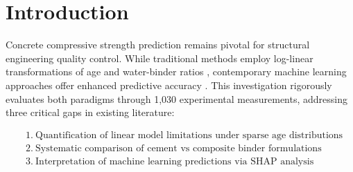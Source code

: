 \section{Introduction}

Concrete compressive strength prediction remains pivotal for structural engineering quality control. While traditional methods employ log-linear transformations of age and water-binder ratios \citep{Yeh1998}, contemporary machine learning approaches offer enhanced predictive accuracy \citep{Abdallah2022}. This investigation rigorously evaluates both paradigms through 1,030 experimental measurements, addressing three critical gaps in existing literature:

\begin{equation}
\begin{aligned}
&1.\ \text{Quantification of linear model limitations under sparse age distributions} \\
&2.\ \text{Systematic comparison of cement vs composite binder formulations} \\
&3.\ \text{Interpretation of machine learning predictions via SHAP analysis}
\end{aligned}
\end{equation} 